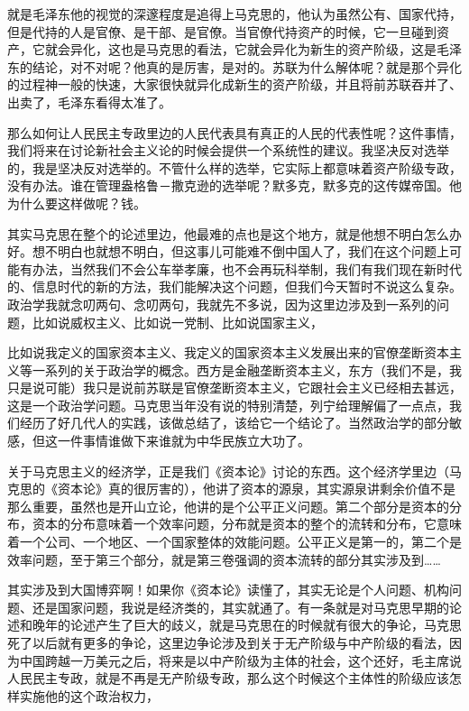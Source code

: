\documentclass[UTF8, 12pt, a4paper]{ctexrep}
\begin{document}
就是毛泽东他的视觉的深邃程度是追得上马克思的，他认为虽然公有、国家代持，但是代持的人是官僚、是干部、是官僚。当官僚代持资产的时候，它一旦碰到资产，它就会异化，这也是马克思的看法，它就会异化为新生的资产阶级，这是毛泽东的结论，对不对呢？他真的是厉害，是对的。苏联为什么解体呢？就是那个异化的过程神一般的快速，大家很快就异化成新生的资产阶级，并且将前苏联吞并了、出卖了，毛泽东看得太准了。

那么如何让人民民主专政里边的人民代表具有真正的人民的代表性呢？这件事情，我们将来在讨论新社会主义论的时候会提供一个系统性的建议。我坚决反对选举的，我是坚决反对选举的。不管什么样的选举，它实际上都意味着资产阶级专政，没有办法。谁在管理盎格鲁－撒克逊的选举呢？默多克，默多克的这传媒帝国。他为什么要这样做呢？钱。

其实马克思在整个的论述里边，他最难的点也是这个地方，就是他想不明白怎么办好。想不明白也就想不明白，但这事儿可能难不倒中国人了，我们在这个问题上可能有办法，当然我们不会公车举孝廉，也不会再玩科举制，我们有我们现在新时代的、信息时代的新的方法，我们能解决这个问题，但我们今天暂时不说这么复杂。政治学我就念叨两句、念叨两句，我就先不多说，因为这里边涉及到一系列的问题，比如说威权主义、比如说一党制、比如说国家主义，

比如说我定义的国家资本主义、我定义的国家资本主义发展出来的官僚垄断资本主义等一系列的关于政治学的概念。西方是金融垄断资本主义，东方（我们不是，我只是说可能）我只是说前苏联是官僚垄断资本主义，它跟社会主义已经相去甚远，这是一个政治学问题。马克思当年没有说的特别清楚，列宁给理解偏了一点点，我们经历了好几代人的实践，该做总结了，该给它一个结论了。当然政治学的部分敏感，但这一件事情谁做下来谁就为中华民族立大功了。

关于马克思主义的经济学，正是我们《资本论》讨论的东西。这个经济学里边（马克思的《资本论》真的很厉害的），他讲了资本的源泉，其实源泉讲剩余价值不是那么重要，虽然也是开山立论，他讲的是个公平正义问题。第二个部分是资本的分布，资本的分布意味着一个效率问题，分布就是资本的整个的流转和分布，它意味着一个公司、一个地区、一个国家整体的效能问题。公平正义是第一的，第二个是效率问题，至于第三个部分，就是第三卷强调的资本流转的部分其实涉及到……

其实涉及到大国博弈啊！如果你《资本论》读懂了，其实无论是个人问题、机构问题、还是国家问题，我说是经济类的，其实就通了。有一条就是对马克思早期的论述和晚年的论述产生了巨大的歧义，就是马克思在的时候就有很大的争论，马克思死了以后就有更多的争论，这里边争论涉及到关于无产阶级与中产阶级的看法，因为中国跨越一万美元之后，将来是以中产阶级为主体的社会，这个还好，毛主席说人民民主专政，就是不再是无产阶级专政，那么这个时候这个主体性的阶级应该怎样实施他的这个政治权力，
\end{document}
